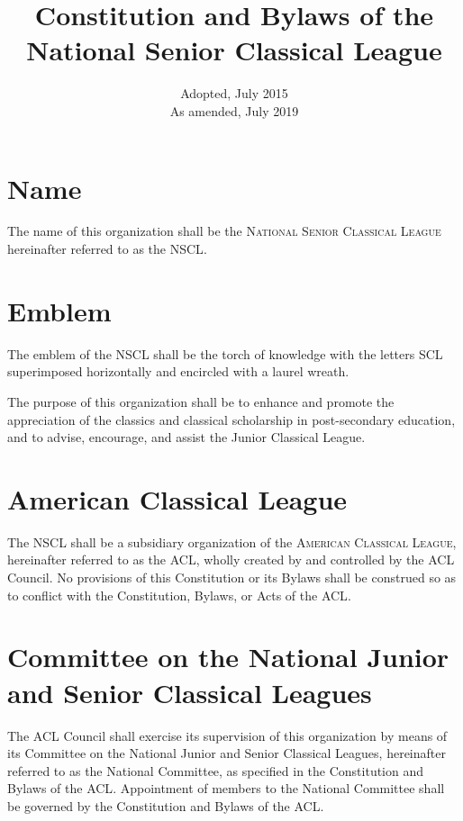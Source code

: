 \documentclass{bylaws}
\title{Constitution and Bylaws of the National Senior Classical League}
\date{
  Adopted, July 2015\\
  As amended, July 2019
}
\newcommand{\NSCL}{\textsc{NSCL}\xspace}
\newcommand{\SCL}{\textsc{SCL}\xspace}
\newcommand{\ACL}{\textsc{ACL}\xspace}
\begin{document}
\maketitle

\begin{linenumbers}[1]

  

  \section{Name}
  The name of this organization shall be the \textsc{National Senior
    Classical League} hereinafter referred to as the \NSCL.\\

  \section{Emblem}
  The emblem of the \NSCL shall be the torch of knowledge with the
  letters \SCL superimposed horizontally and encircled with a laurel
  wreath.\\


  The purpose of this organization shall be to enhance and promote the
  appreciation of the classics and classical scholarship in
  post-secondary education, and to advise, encourage, and assist the
  Junior Classical League.\\


  \section{American Classical League}
  The \NSCL shall be a subsidiary organization of the \textsc{American
    Classical League}, hereinafter referred to as the \ACL, wholly
  created by and controlled by the \ACL Council. No provisions of this
  Constitution or its Bylaws shall be construed so as to conflict with
  the Constitution, Bylaws, or Acts of the \ACL.\\

  \section{Committee on the National Junior and Senior Classical
    Leagues}
  \begin{enumerate}
    The \ACL Council shall exercise its supervision of this organization
    by means of its Committee on the National Junior and Senior
    Classical Leagues, hereinafter referred to as the National
    Committee, as specified in the Constitution and Bylaws of the
    \ACL. Appointment of members to the National Committee shall be
    governed by the Constitution and Bylaws of the \ACL.
    

\end{enumerate}
\end{linenumbers}
\end{document}

